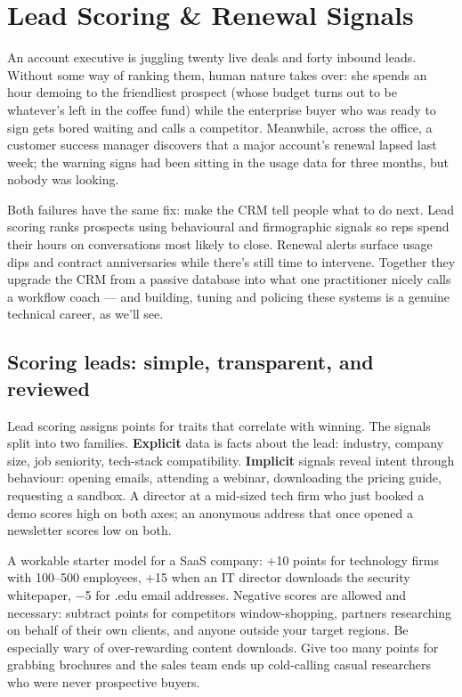 \section{Lead Scoring \& Renewal Signals}
An account executive is juggling twenty live deals and forty inbound leads. Without some way of ranking them, human nature takes over: she spends an hour demoing to the friendliest prospect (whose budget turns out to be whatever's left in the coffee fund) while the enterprise buyer who was ready to sign gets bored waiting and calls a competitor. Meanwhile, across the office, a customer success manager discovers that a major account's renewal lapsed last week; the warning signs had been sitting in the usage data for three months, but nobody was looking.


Both failures have the same fix: make the CRM tell people what to do next. Lead scoring ranks prospects using behavioural and firmographic signals so reps spend their hours on conversations most likely to close. Renewal alerts surface usage dips and contract anniversaries while there's still time to intervene. Together they upgrade the CRM from a passive database into what one practitioner nicely calls a workflow coach — and building, tuning and policing these systems is a genuine technical career, as we'll see.



\subsection{Scoring leads: simple, transparent, and reviewed}


Lead scoring assigns points for traits that correlate with winning. The signals split into two families. \textbf{Explicit} data is facts about the lead: industry, company size, job seniority, tech-stack compatibility. \textbf{Implicit} signals reveal intent through behaviour: opening emails, attending a webinar, downloading the pricing guide, requesting a sandbox. A director at a mid-sized tech firm who just booked a demo scores high on both axes; an anonymous address that once opened a newsletter scores low on both.


A workable starter model for a SaaS company: +10 points for technology firms with 100–500 employees, +15 when an IT director downloads the security whitepaper, −5 for .edu email addresses. Negative scores are allowed and necessary: subtract points for competitors window-shopping, partners researching on behalf of their own clients, and anyone outside your target regions. Be especially wary of over-rewarding content downloads. Give too many points for grabbing brochures and the sales team ends up cold-calling casual researchers who were never prospective buyers.


